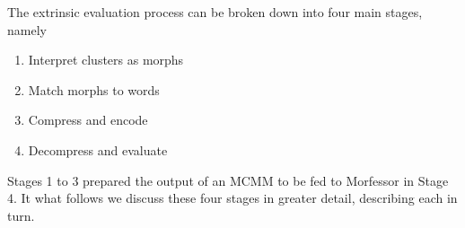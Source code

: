 The extrinsic evaluation process can be broken down into four main stages, namely
\begin{enumerate}
\item Interpret clusters as morphs
\item Match morphs to words
\item Compress and encode
\item Decompress and evaluate
\end{enumerate}
Stages 1 to 3 prepared the output of an MCMM to be fed to Morfessor in Stage 4. 
It what follows we discuss these four stages in
 greater detail, describing each in turn.
